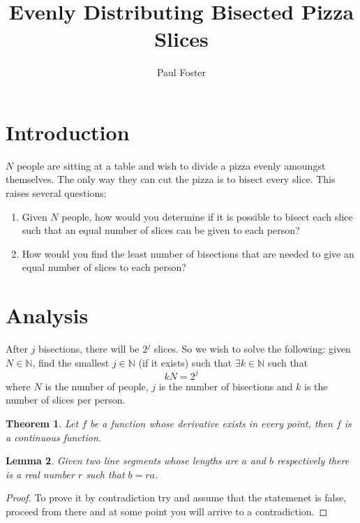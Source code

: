 \documentclass{article}
\title{Evenly Distributing Bisected Pizza Slices}
\author{Paul Foster}
\begin{document}
\maketitle

\newtheorem{theorem}{Theorem}
\newtheorem{corollary}{Corollary}[theorem]
\newtheorem{lemma}[theorem]{Lemma}

\section{Introduction}
$N$ people are sitting at a table and wish to divide a pizza evenly amoungst themselves. The only way they can cut the pizza is to bisect every slice. This raises several questions:
\begin{enumerate}
  \item Given $N$ people, how would you determine if it is possible to bisect each slice such that an equal number of slices can be given to each person?
  \item How would you find the least number of bisections that are needed to give an equal number of slices to each person?
\end{enumerate}

\section{Analysis}
After $j$ bisections, there will be $2^j$ slices. So we wish to solve the following: given $N \in \mathbb{N}$, find the smallest $j \in \mathbb{N}$ (if it exists) such that $\exists k \in \mathbb{N}$ such that
\begin{equation}
  kN = 2^j
\end{equation}
where $N$ is the number of people, $j$ is the number of bisections and $k$ is the number of slices per person.

\begin{theorem}
Let $f$ be a function whose derivative exists in every point, then $f$
is a continuous function.
\end{theorem}

\begin{lemma}
Given two line segments whose lengths are $a$ and $b$ respectively there
is a real number $r$ such that $b=ra$.
\end{lemma}

\begin{proof}
To prove it by contradiction try and assume that the statemenet is false,
proceed from there and at some point you will arrive to a contradiction.
\end{proof}
\end{document}
